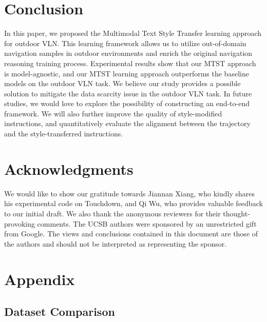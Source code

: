 \documentclass[11pt,a4paper]{article}
\begin{document}
\section{Conclusion}
In this paper, we proposed the Multimodal Text Style Transfer learning approach for outdoor VLN. This learning framework allows us to utilize out-of-domain navigation samples in outdoor environments and enrich the original navigation reasoning training process. Experimental results show that our MTST approach is model-agnostic, and our MTST learning approach outperforms the baseline models on the outdoor VLN task.
We believe our study provides a possible solution to mitigate the data scarcity issue in the outdoor VLN task. In future studies, we would love to explore the possibility of constructing an end-to-end framework. We will also further improve the quality of style-modified instructions,  and quantitatively evaluate the alignment between the trajectory and the style-transferred instructions. 

\section*{Acknowledgments}
We would like to show our gratitude towards Jiannan Xiang, who kindly shares his experimental code on Touchdown, and Qi Wu, who provides valuable feedback to our initial draft. We also thank the anonymous reviewers for their thought-provoking comments.
The UCSB authors were sponsored by an unrestricted gift from Google. The views and conclusions contained in this document are those of the authors and should not be interpreted as representing the sponsor.





\clearpage

\appendix

\section{Appendix}

\subsection{Dataset Comparison~}
\end{document}
